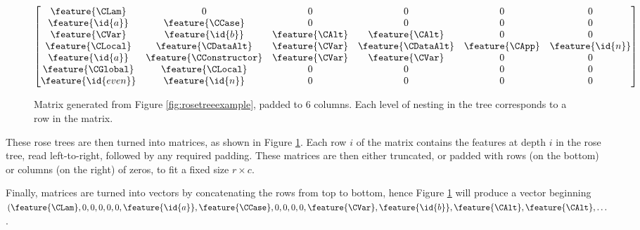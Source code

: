 \begin{figure}
    \begin{equation*}
      \begin{bmatrix}
        \feature{\CLam}      & 0                       & 0                 & 0                   & 0               & 0                \\
        \feature{\id{a}}     & \feature{\CCase}        & 0                 & 0                   & 0               & 0                \\
        \feature{\CVar}      & \feature{\id{b}}        & \feature{\CAlt}   & \feature{\CAlt}     & 0               & 0                \\
        \feature{\CLocal}    & \feature{\CDataAlt}     & \feature{\CVar}   & \feature{\CDataAlt} & \feature{\CApp} & \feature{\id{n}} \\
        \feature{\id{a}}     & \feature{\CConstructor} & \feature{\CVar}   & \feature{\CVar}     & 0               & 0                \\
        \feature{\CGlobal}   & \feature{\CLocal}       & 0                 & 0                   & 0               & 0                \\
        \feature{\id{even}}  & \feature{\id{n}}        & 0                 & 0                   & 0               & 0
      \end{bmatrix}
    \end{equation*}
    \caption{Matrix generated from Figure \ref{fig:rosetreeexample}, padded to 6 columns. Each level of nesting in the tree corresponds to a row in the matrix.}
    \label{fig:matrixexample}
\end{figure}

These rose trees are then turned into matrices, as shown in Figure \ref{fig:matrixexample}. Each row $i$ of the matrix contains the features at depth $i$ in the rose tree, read left-to-right, followed by any required padding. These matrices are then either truncated, or padded with rows (on the bottom) or columns (on the right) of zeros, to fit a fixed size $r \times c$.

\begin{sloppypar}
  Finally, matrices are turned into vectors by concatenating the rows from top
  to bottom, hence Figure \ref{fig:matrixexample} will produce a vector
  beginning
  $(\feature{\CLam} ,
    0               ,
    0               ,
    0               ,
    0               ,
    0               ,
    \feature{\id{a}},
    \feature{\CCase},
    0               ,
    0               ,
    0               ,
    0               ,
    \feature{\CVar} ,
    \feature{\id{b}},
    \feature{\CAlt} ,
    \feature{\CAlt} ,
    \dots$.
\end{sloppypar}

